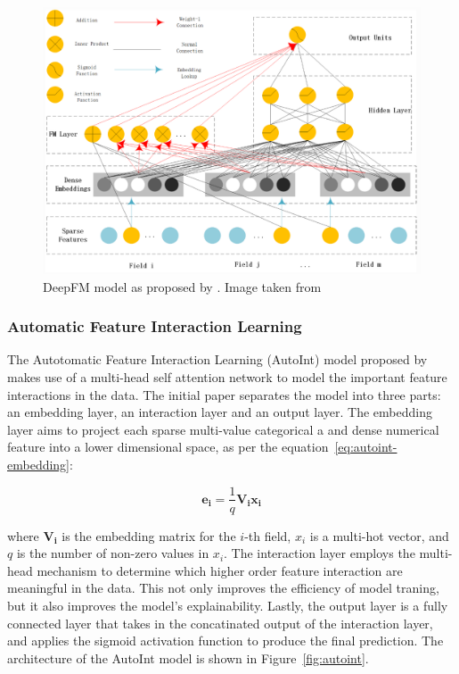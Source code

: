 \documentclass{mldsmsc}
\begin{document}
\begin{figure}[h]
\centering
\includegraphics[width=\textwidth]{../figures/dfm.png}
\caption{DeepFM model as proposed by \cite{RefWorks:guo2017deepfm:}. Image taken from \cite{RefWorks:shen2017deepctr:}}
\label{fig:deepfm}
\end{figure}


\subsubsection{Automatic Feature Interaction Learning}

The Autotomatic Feature Interaction Learning (AutoInt) model proposed by
\cite{RefWorks:song2019autoint} makes use of a multi-head self attention
network to model the important feature interactions in the data. The initial 
paper separates the model into three parts: an embedding layer, an interaction layer 
and an output layer. The embedding layer aims to project each sparse multi-value
categorical a and dense numerical feature into a lower dimensional space, as per the equation~\ref{eq:autoint-embedding}:

\begin{equation}
\label{eq:autoint-embedding}
\mathbf{e_i} = \frac{1}{q} \mathbf{V_i x_i}
\end{equation}

where $\mathbf{V_i}$ is the embedding matrix for the $i$-th field, $x_i$ is a multi-hot vector, and $q$ 
is the number of non-zero values in $x_i$. The interaction layer employs the multi-head
mechanism to determine which higher order feature interaction are meaningful in the data. This not only
improves the efficiency of model traning, but it also improves the model's explainability. Lastly,
the output layer is a fully connected layer that takes in the concatinated output 
of the interaction layer, and applies the sigmoid activation function to produce the final prediction.
The architecture of the AutoInt model is shown in Figure~\ref{fig:autoint}.
\end{document}
